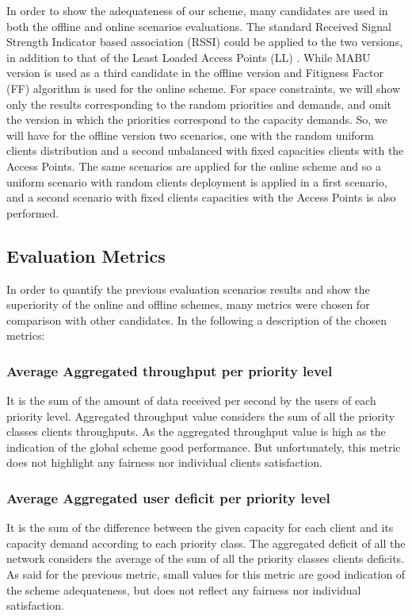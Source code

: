 \documentclass[journal,transmag]{IEEEtran}
\begin{document}
In order to show the adequateness of our scheme, many candidates are used in both the offline and online scenarios evaluations. The standard Received Signal Strength Indicator based association (RSSI) could be applied to the two versions, in addition to that of the Least Loaded Access Points (LL) \cite{15dynamic_AP_association_SDN}. While MABU version \cite{16throughput_optimisation_association_bandwidth} is used as a third candidate in the offline version and Fitigness Factor (FF) \cite{17QOS_AP_selection} algorithm is used for the online scheme. 
For space constraints, we will show only the results corresponding to the random priorities and demands, and omit the version in which the priorities correspond to the capacity demands. So, we will have for the offline version two scenarios, one with the random uniform clients distribution and a second unbalanced with fixed capacities clients with the Access Points. The same scenarios are applied for the online scheme and so a uniform scenario with random clients deployment is applied in a first scenario, and a second scenario with fixed clients capacities with the Access Points is also performed.  

\subsection{Evaluation Metrics}
In order to quantify the previous evaluation scenarios results and show the superiority of the online and offline schemes, many metrics were chosen for comparison with other candidates. In the following a description of the chosen metrics:
 
\subsubsection{Average Aggregated throughput per priority level}
It is the sum of the amount of data received per second by the users of each priority level. Aggregated throughput value considers the sum of all the priority classes clients throughputs. As the aggregated throughput value is high as the indication of the global scheme good performance. But unfortunately, this metric does not highlight any fairness nor individual clients satisfaction.  

\subsubsection{Average Aggregated user deficit per priority level}
It is the sum of the difference between the given capacity for each client and its capacity demand according to each priority class. The aggregated deficit of all the network considers the average of the sum of all the priority classes clients deficits. As said for the previous metric, small values for this metric are good indication of the scheme adequateness, but does not reflect any fairness nor individual satisfaction. 
 
\end{document}
